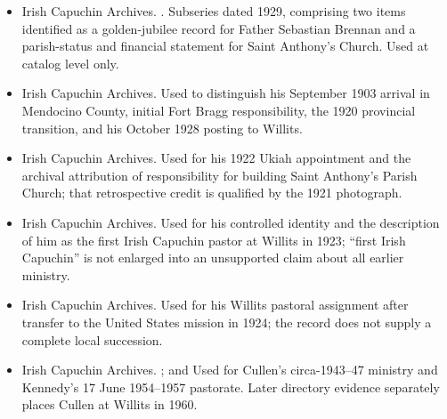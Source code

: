\begin{itemize}[leftmargin=1.35em,itemsep=0.2em,topsep=0.2em]
\item Irish Capuchin Archives. . Subseries dated 1929, comprising two items identified as a golden-jubilee record for Father Sebastian Brennan and a parish-status and financial statement for Saint Anthony's Church. Used at catalog level only.
\item Irish Capuchin Archives.  Used to distinguish his September 1903 arrival in Mendocino County, initial Fort Bragg responsibility, the 1920 provincial transition, and his October 1928 posting to Willits.
\item Irish Capuchin Archives.  Used for his 1922 Ukiah appointment and the archival attribution of responsibility for building Saint Anthony's Parish Church; that retrospective credit is qualified by the 1921 photograph.
\item Irish Capuchin Archives.  Used for his controlled identity and the description of him as the first Irish Capuchin pastor at Willits in 1923; ``first Irish Capuchin'' is not enlarged into an unsupported claim about all earlier ministry.
\item Irish Capuchin Archives.  Used for his Willits pastoral assignment after transfer to the United States mission in 1924; the record does not supply a complete local succession.
\item Irish Capuchin Archives. ; and  Used for Cullen's circa-1943--47 ministry and Kennedy's 17 June 1954--1957 pastorate. Later directory evidence separately places Cullen at Willits in 1960.
\end{itemize}

